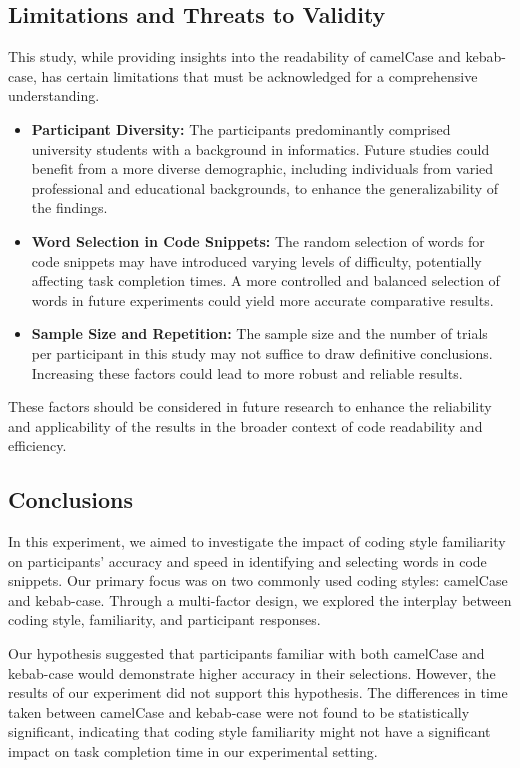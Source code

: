 \documentclass{article}
\begin{document}
\subsection{Limitations and Threats to Validity}
This study, while providing insights into the readability of camelCase and kebab-case, has certain limitations that must be acknowledged for a comprehensive understanding.

\begin{itemize}
  \item \textbf{Participant Diversity:} The participants predominantly comprised university students with a background in informatics. Future studies could benefit from a more diverse demographic, including individuals from varied professional and educational backgrounds, to enhance the generalizability of the findings.

  \item \textbf{Word Selection in Code Snippets:} The random selection of words for code snippets may have introduced varying levels of difficulty, potentially affecting task completion times. A more controlled and balanced selection of words in future experiments could yield more accurate comparative results.

  \item \textbf{Sample Size and Repetition:} The sample size and the number of trials per participant in this study may not suffice to draw definitive conclusions. Increasing these factors could lead to more robust and reliable results.
\end{itemize}

These factors should be considered in future research to enhance the reliability and applicability of the results in the broader context of code readability and efficiency.

\subsection{Conclusions}

In this experiment, we aimed to investigate the impact of coding style familiarity on participants' accuracy and speed in identifying and selecting words in code snippets. Our primary focus was on two commonly used coding styles: camelCase and kebab-case. Through a multi-factor design, we explored the interplay between coding style, familiarity, and participant responses.

Our hypothesis suggested that participants familiar with both camelCase and kebab-case would demonstrate higher accuracy in their selections. However, the results of our experiment did not support this hypothesis. The differences in time taken between camelCase and kebab-case were not found to be statistically significant, indicating that coding style familiarity might not have a significant impact on task completion time in our experimental setting.
\end{document}
